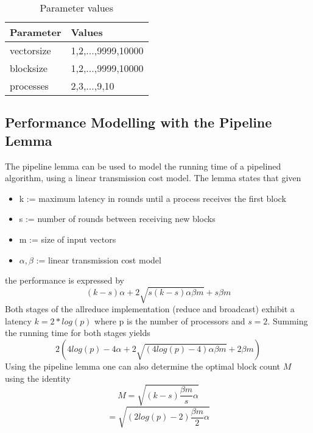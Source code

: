 \documentclass[twoside,twocolumn,hidelinks]{article}
\begin{document}
\begin{table}[h]
      \centering
      \begin{tabular}{ll}
            \toprule
            Parameter & Values \\
            \midrule
            vectorsize   & 1,2,...,9999,10000 \\
            blocksize    & 1,2,...,9999,10000  \\
            processes    & 2,3,...,9,10  \\
            \bottomrule
      \end{tabular}
      \caption{Parameter values}
\end{table}

\subsection{Performance Modelling with the Pipeline Lemma}
The pipeline lemma can be used to model the running time of a pipelined algorithm, using a linear transmission cost model. The lemma states that given
\begin{itemize}
      \item k := maximum latency in rounds until a process receives the first block
      \item s := number of rounds between receiving new blocks
      \item m := size of input vectors
      \item $\alpha,\beta$ := linear transmission cost model
\end{itemize}
the performance is expressed by
\begin{equation}
      (k-s)\alpha + 2\sqrt{s(k-s)\alpha\beta m} + s\beta m
\end{equation}
Both stages of the allreduce implementation (reduce and broadcast) exhibit a latency $k=2*log(p)$ where p is the number of processors and $s=2$. Summing the running time for both stages yields
\begin{equation}
      2(4log(p)-4\alpha + 2\sqrt{(4log(p)-4)\alpha\beta m} + 2\beta m)
\end{equation}
Using the pipeline lemma one can also determine the optimal block count $M$ using the identity 
\begin{equation}
      M = \sqrt{(k-s)\frac{\beta m}{s}\alpha}
\end{equation}
\begin{equation}
      = \sqrt{(2log(p)-2)\frac{\beta m}{2}\alpha}
\end{equation}

\printbibliography

\end{document}
